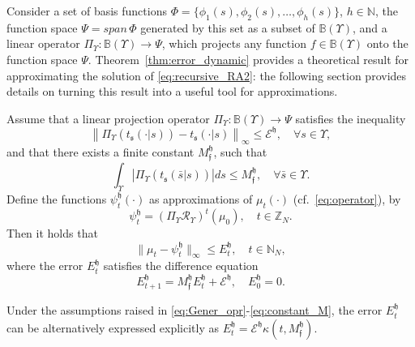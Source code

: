 \documentclass{LMCS}
\begin{document}
Consider a set of basis functions $\Phi = \{\phi_1(s),\phi_2(s),\ldots,\phi_h(s)\}$, $h\in\mathbb N$,
the function space $\Psi = span\,\Phi$ generated by this set as a subset of $\mathbb B(\Upsilon)$, 
and a linear operator $\Pi_{\Upsilon}:\mathbb B(\Upsilon)\rightarrow \Psi$, 
which projects any function $f\in\mathbb B(\Upsilon)$ onto the function space $\Psi$.
Theorem~\ref{thm:error_dynamic} provides a theoretical result for approximating the solution of \eqref{eq:recursive_RA2}: 
the following section provides details on turning this result into a useful tool for approximations.
\begin{thm}\label{thm:error_dynamic}
Assume that a linear projection operator $\Pi_{\Upsilon}:\mathbb B(\Upsilon)\rightarrow \Psi$ satisfies the inequality
\begin{equation}\label{eq:Gener_opr}
\left\| \Pi_{\Upsilon}(t_{\mathfrak s}(\cdot|s)) - t_{\mathfrak s}(\cdot|s)\right\|_\infty\le\mathcal E^{\mathfrak h},  
\quad \forall s\in\Upsilon,
\end{equation}
and that there exists a finite constant $M_{\mathfrak f}^{\mathfrak h}$, 
such that
\begin{equation}\label{eq:constant_M}
\int_{\Upsilon}\left|\Pi_{\Upsilon}(t_{\mathfrak s}(\bar s|s))\right| ds\le M_{\mathfrak f}^{\mathfrak h}, 
\quad \forall \bar s\in\Upsilon.
\end{equation}
Define the functions $\psi_t^{\mathfrak h}(\cdot)$ as approximations of $\mu_t(\cdot)$ (cf. \,\eqref{eq:operator}), by
\begin{equation}\label{eq:dis_val_fun}
\psi_t^{\mathfrak h} = (\Pi_{\Upsilon}\mathcal R_\Upsilon)^t(\mu_0), \quad t\in\mathbb Z_N.
\end{equation}
Then it holds that 
\begin{equation}\label{eq:Main_inequality}
\|\mu_t-\psi_t^{\mathfrak h}\|_\infty\le E_t^{\mathfrak h}, \quad t\in\mathbb N_N,
\end{equation}
where the error $E_t^{\mathfrak h}$ satisfies the difference equation
\begin{equation*}
E_{t+1}^{\mathfrak h} = M_{\mathfrak f}^{\mathfrak h} E_t^{\mathfrak h} + \mathcal E^{\mathfrak h},\quad E_0^{\mathfrak h} = 0. 
\end{equation*}
\end{thm}
\begin{cor}
\label{thm:dir_error}
Under the assumptions raised in \eqref{eq:Gener_opr}-\eqref{eq:constant_M}, 
the error $E_t^{\mathfrak h}$ can be alternatively expressed explicitly as $E_t^{\mathfrak h} = \mathcal E^{\mathfrak h}\kappa(t,M_{\mathfrak f}^{\mathfrak h})$.
\end{cor}
\end{document}
